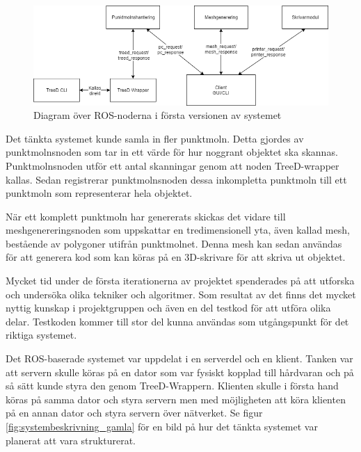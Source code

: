 \begin{figure}[H]
	\centering
	\includegraphics[width=130mm]{figures/Noddiagram.png}
	\caption{Diagram över ROS-noderna i första versionen av systemet}
	\label{fig:noddiagram}
\end{figure}

Det tänkta systemet kunde samla in fler punktmoln. Detta gjordes av punktmolnsnoden som tar in ett värde för hur noggrant objektet ska skannas. Punktmolnsnoden utför ett antal skanningar genom att noden TreeD-wrapper kallas. Sedan registrerar punktmolnsnoden dessa inkompletta punktmoln till ett punktmoln som representerar hela objektet.

När ett komplett punktmoln har genererats skickas det vidare till meshgenereringsnoden som uppskattar en tredimensionell yta, även kallad mesh, bestående av polygoner utifrån punktmolnet. Denna mesh kan sedan användas för att generera kod som kan köras på en 3D-skrivare för att skriva ut objektet.

Mycket tid under de första iterationerna av projektet spenderades på att utforska och undersöka olika tekniker och algoritmer. Som resultat av det finns det mycket nyttig kunskap i projektgruppen och även en del testkod för att utföra olika delar. Testkoden kommer till stor del kunna användas som utgångspunkt för det riktiga systemet.

Det ROS-baserade systemet var uppdelat i en serverdel och en klient. Tanken var att servern skulle köras på en dator som var fysiskt kopplad till hårdvaran och på så sätt kunde styra den genom TreeD-Wrappern. Klienten skulle i första hand köras på samma dator och styra servern men med möjligheten att köra klienten på en annan dator och styra servern över nätverket. Se figur \ref{fig:systembeskrivning_gamla} för en bild på hur det tänkta systemet var planerat att vara strukturerat.

